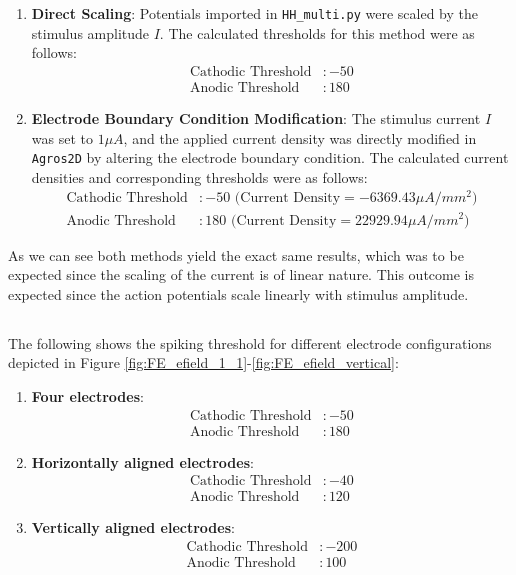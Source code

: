 \documentclass{article}
\begin{document}
    \begin{enumerate}
        \item \textbf{Direct Scaling}: Potentials imported in \texttt{HH\_multi.py} were scaled by the stimulus amplitude $I$. The calculated thresholds for this method were as follows:
        \begin{align*}
            \text{Cathodic Threshold} &: -50 \\
            \text{Anodic Threshold} &: 180
        \end{align*}

        \item \textbf{Electrode Boundary Condition Modification}: The stimulus current $I$ was set to $1\mu A$, and the applied current density was directly modified in \texttt{Agros2D} by altering the electrode boundary condition. The calculated current densities and corresponding thresholds were as follows:
        \begin{align*}
            \text{Cathodic Threshold} &: -50 \text{ (Current Density} = -6369.43\mu A/mm^2) \\
            \text{Anodic Threshold} &: 180 \text{ (Current Density} = 22929.94\mu A/mm^2)
        \end{align*}
    \end{enumerate}

    As we can see both methods yield the exact same results, which was to be expected since the scaling of the current is of linear nature.
    This outcome is expected since the action potentials scale linearly with stimulus amplitude.

    \subsection{}

    The following shows the spiking threshold for different electrode configurations depicted in Figure \ref{fig:FE_efield_1_1}-\ref{fig:FE_efield_vertical}:

    \begin{enumerate}
        \item \textbf{Four electrodes}:
        \begin{align*}
            \text{Cathodic Threshold} &: -50 \\
            \text{Anodic Threshold} &: 180
        \end{align*}
        \item \textbf{Horizontally aligned electrodes}:
        \begin{align*}
            \text{Cathodic Threshold} &: -40 \\
            \text{Anodic Threshold} &: 120
        \end{align*}

        \item \textbf{Vertically aligned electrodes}:
        \begin{align*}
            \text{Cathodic Threshold} &: -200 \\
            \text{Anodic Threshold} &: 100
        \end{align*}
    \end{enumerate}
\end{document}
